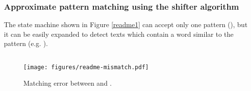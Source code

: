 \documentclass{sigchi}
\begin{document}

\subsubsection{Approximate pattern matching using the shifter algorithm}

The state machine shown in Figure \ref{readme1} can accept only one pattern
(), but
it can be easily expanded to detect texts which contain a word
similar to the pattern (e.g. ).

\begin{figure}[htb]
\begin{verbatim}
\end{verbatim}
\centerline{\texttt{[image: figures/readme-mismatch.pdf]}}
\caption{Matching error between  and .}
\label{readme-reddy-mismatch}
\end{figure}
\end{document}
